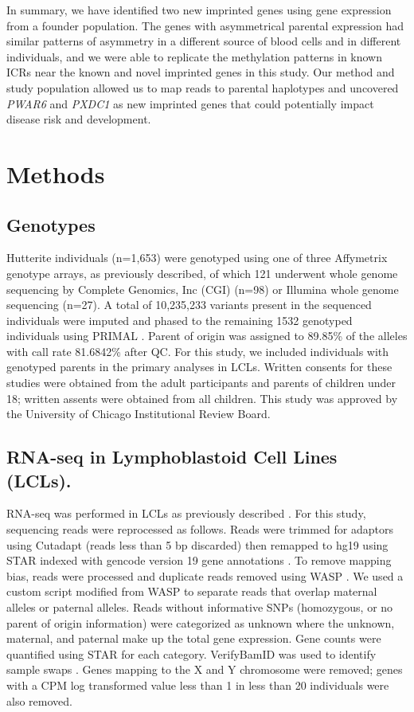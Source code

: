 In summary, we have identified two new imprinted genes using gene expression from a founder population. The genes with asymmetrical parental expression had similar patterns of asymmetry in a different source of blood cells and in different individuals, and we were able to replicate the methylation patterns in known ICRs near the known and novel imprinted genes in this study. Our method and study population allowed us to map reads to parental haplotypes and uncovered \emph{PWAR6} and \emph{PXDC1} as new imprinted genes that could potentially impact disease risk and development.

\section{Methods}\label{ch03-methods}

\subsection{Genotypes}\label{Genotypes}
Hutterite individuals (n=1,653) were genotyped using one of three Affymetrix genotype arrays, as previously described\citep{Livne2015}, of which 121 underwent whole genome sequencing by Complete Genomics, Inc (CGI) (n=98) or Illumina whole genome sequencing (n=27). A total of 10,235,233 variants present in the sequenced individuals were imputed and phased to the remaining 1532 genotyped individuals using PRIMAL \citep{Livne2015}. Parent of origin was assigned to 89.85\% of the alleles with call rate 81.6842\% after QC. For this study, we included individuals with genotyped parents in the primary analyses in LCLs. Written consents for these studies were obtained from the adult participants and parents of children under 18; written assents were obtained from all children. This study was approved by the University of Chicago Institutional Review Board.   

\subsection{RNA-seq in Lymphoblastoid Cell Lines (LCLs).}\label{RNA-seq in Lymphoblastoid Cell Lines (LCLs).}
RNA-seq was performed in LCLs as previously described \citep{Cusanovich:2016id}. For this study, sequencing reads were reprocessed as follows. Reads were trimmed for adaptors using Cutadapt (reads less than 5 bp discarded) then remapped to hg19 using STAR indexed with gencode version 19 gene annotations \citep{Dobin:2002by, Martin:2011eu}. To remove mapping bias, reads were processed and duplicate reads removed using WASP \citep{vandeGeijn:2015hi}. We used a custom script modified from WASP to separate reads that overlap maternal alleles or paternal alleles. Reads without informative SNPs (homozygous, or no parent of origin information) were categorized as unknown where the unknown, maternal, and paternal make up the total gene expression. Gene counts were quantified using STAR for each category. VerifyBamID was used to identify sample swaps \citep{Jun:2012je}. Genes mapping to the X and Y chromosome were removed; genes with a CPM log transformed value less than 1 in less than 20 individuals were also removed.

